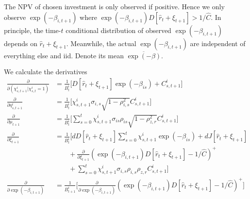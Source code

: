 The NPV of chosen investment is only observed if positive. Hence we only observe $\exp(-\beta_{i,t+1})$ where $\exp(- \beta_{i, t+1}) D[\hat{r}_{t}+\xi_{t+1}] > 1/\hat C$. In principle, the time-$t$ conditional distribution of observed $\exp(-\beta_{i,t+1})$ depends on $\hat{r}_t+\xi_{t+1}$. Meanwhile, the actual $\exp(-\beta_{i,t+1})$ are independent of everything else and iid. Denote its mean $\overline{\exp(-\beta)}$. 

We calculate the derivatives
\begin{align*}
\frac{\partial}{\partial (\chi_{s,t+1}^i|\chi_{s,t}^i=1)}
    &= \frac{1}{B_t^i}\Bigg[ D[\hat r_{t}+\xi_{t+1}]\exp(-\beta_{is}) + C_{s,t+1}^i
    \Bigg] \\
\frac{\partial}{\partial \eta_{s,t+1}^i}
    &= \frac{1}{B_t^i}\Bigg[ 
    \chi_{s,t+1}^i\sigma_{i,s}\sqrt{1-\rho_{i,s}^2}C_{s,t+1}^i\Bigg] \\
\frac{\partial}{\partial \mu_{t+1}}
    &= \frac{1}{B_t^i}\Bigg[
    \sum_{s=0}^{t}\chi_{s,t+1}^i \sigma_{is}\rho_{is}\sqrt{1-\rho_{z,r}^2}C_{s,t+1}^i
    \Bigg] \\
\frac{\partial}{\partial \xi_{t+1}}
    &= \frac{1}{B_t^i}\Bigg[
     dD[\hat{r}_t+\xi_{t+1}]\sum_{s=0}^{t} \chi_{s,t+1}^i\exp(-\beta_{is}) + dJ[\hat r_t+\xi_{t+1}] \\
    &\quad\quad + \frac{\partial}{\partial \xi_{t+1}}\left(\exp(- \beta_{i, t+1}) D[\hat r_{t}+\xi_{t+1}] - 1/\hat C\right)^+\\ &\quad\quad + \sum_{s=0}^{t}\chi_{s,t+1}^i \sigma_{i,s}\rho_{i,s}\rho_{z,r}C_{s,t+1}^i
    \Bigg] \\
\frac{\partial}{\partial \exp(-\beta_{i,t+1})}
    &= \frac{1}{B_{t+1}^i}
    \Bigg[\frac{\partial}{\partial \exp(- \beta_{i, t+1})} \left(\exp(- \beta_{i, t+1})D[\hat r_{t}+\xi_{t+1}] - 1/\hat C\right)^+\Bigg] 
\end{align*}

